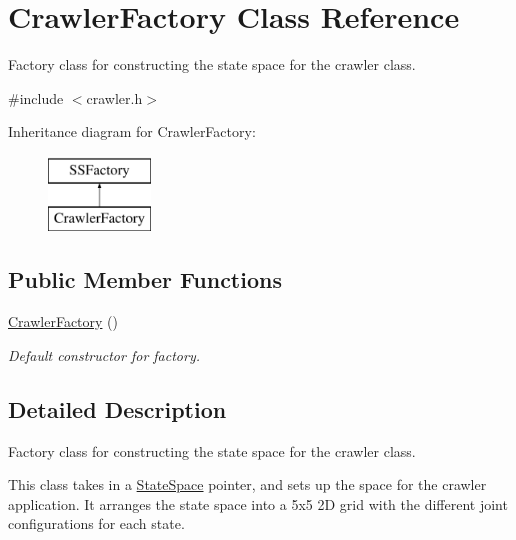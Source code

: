 \hypertarget{classCrawlerFactory}{\section{Crawler\-Factory Class Reference}
\label{classCrawlerFactory}
}


Factory class for constructing the state space for the crawler class.  




{\ttfamily \#include $<$crawler.\-h$>$}

Inheritance diagram for Crawler\-Factory\-:\begin{figure}[H]
\begin{center}
\leavevmode
\includegraphics[height=2.000000cm]{classCrawlerFactory}
\end{center}
\end{figure}
\subsection*{Public Member Functions}
\begin{DoxyCompactItemize}
\item 
\hyperlink{classCrawlerFactory_ac99d39a8262df1890882edc33161a551}{Crawler\-Factory} ()
\begin{DoxyCompactList}\small\item\em Default constructor for factory. \end{DoxyCompactList}\end{DoxyCompactItemize}


\subsection{Detailed Description}
Factory class for constructing the state space for the crawler class. 

This class takes in a \hyperlink{classStateSpace}{State\-Space} pointer, and sets up the space for the crawler application. It arranges the state space into a 5x5 2\-D grid with the different joint configurations for each state. 

